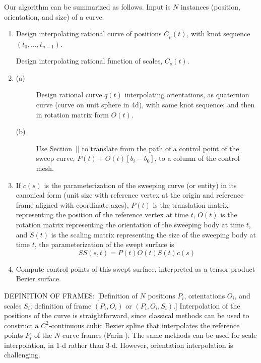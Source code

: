 Our algorithm can be summarized as follows.
Input is $N$ instances (position, orientation, and size) of a curve.
\begin{enumerate}
\item
	Design interpolating rational curve of positions $C_p(t)$,
	with knot sequence $(t_0,\ldots,t_{n-1})$.

	Design interpolating rational function of scales, $C_s(t)$.
\item
\begin{description}
\item[(a)]
	Design rational curve $q(t)$ interpolating orientations,
	as quaternion curve (curve on unit sphere in 4d),
	with same knot sequence;
	and then in rotation matrix form $O(t)$.
\item[(b)]
	Use Section~\ref{} to translate from the path of a control
	point of the sweep curve, $P(t) + O(t)[b_i - b_0]$,
	to a column of the control mesh.
\end{description}
\item
	If $c(s)$ is the parameterization of the sweeping 
	curve (or entity) in its canonical form (unit size 
	with reference vertex at the origin 
	and reference frame aligned with coordinate axes),
	$P(t)$ is the translation matrix representing the 
	position of the reference vertex at time $t$,
	$O(t)$ is the rotation matrix representing the
	orientation of the sweeping body at time $t$,
	and $S(t)$ is the scaling matrix representing the
	size of the sweeping body at time $t$,
	the parameterization of the swept surface is
\begin{equation}
\label{eqn:matrix}
	SS(s,t) = P(t)O(t)S(t)c(s)
\end{equation}
\item
	Compute control points of this swept surface,
	interpreted as a tensor product Bezier surface.
\end{enumerate}


DEFINITION OF FRAMES:
[Definition of $N$ positions $P_i$, orientations $O_i$, and scales $S_i$;
definition of frame $(P_i,O_i)$ or $(P_i,O_i,S_i)$.]
Interpolation of the positions of the curve is straightforward,
since classical methods can be used to construct a $C^2$-continuous
cubic Bezier spline that interpolates the reference points $P_i$ 
of the $N$ curve frames (Farin \cite{farin93}).
The same methods can be used for scale interpolation, in 1-d rather
than 3-d.
However, orientation interpolation is challenging.

